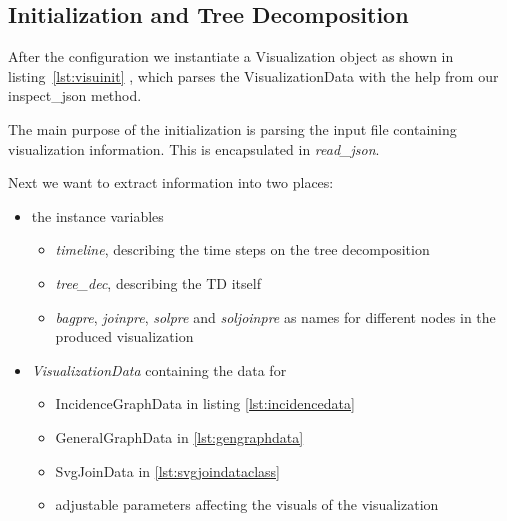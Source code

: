 \documentclass[a4paper, 12pt, bibliography=totoc]{scrartcl}
\begin{document}
\subsection{Initialization and Tree Decomposition}

After the configuration we instantiate a Visualization object as shown in listing~\ref{lst:visuinit} , which parses the VisualizationData with the help from our inspect\_json method. 

The main purpose of the initialization is parsing the input file containing visualization information.
This is encapsulated in \textit{read\_json}.

Next we want to extract information into two places: 
\begin{itemize}
	\item the instance variables 
	\begin{itemize}
		\item \textit{timeline}, describing the time steps on the tree decomposition
		\item \textit{tree\_dec}, describing the TD itself
		\item \textit{bagpre}, \textit{joinpre}, \textit{solpre} and \textit{soljoinpre} as names for different nodes in the produced visualization
	\end{itemize}
	\item \textit{VisualizationData} containing the data for 
	\begin{itemize}
		\item IncidenceGraphData in listing \ref{lst:incidencedata}
		\item GeneralGraphData in \ref{lst:gengraphdata}
		\item SvgJoinData in \ref{lst:svgjoindataclass}
		\item adjustable parameters affecting the visuals of the visualization
	\end{itemize}
\end{itemize}
\end{document}
